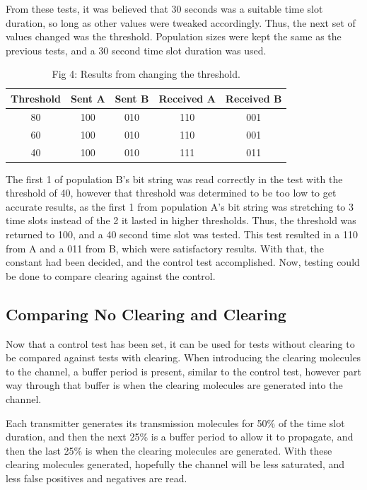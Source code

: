 \documentclass[conference]{IEEEtran}
\begin{document}
From these tests, it was believed that 30 seconds was a suitable time slot duration, so long as other values were tweaked accordingly. Thus, the next set of values changed was the threshold. Population sizes were kept the same as the previous tests, and a 30 second time slot duration was used.

\begin{table}[htbp]
\begin{center}
\begin{tabular}{|c|c|c|c|c|}
\hline
Threshold & Sent A & Sent B & Received A & Received B\\\hline
80 & 100 & 010 & 110 & 001\\\hline
60 & 100 & 010 & 110 & 001\\\hline
40 & 100 & 010 & 111 & 011\\\hline
\end{tabular}
\end{center}
\caption{Fig 4: Results from changing the threshold.}
\end{table}

The first 1 of population B’s bit string was read correctly in the test with the threshold of 40, however that threshold was determined to be too low to get accurate results, as the first 1 from population A’s bit string was stretching to 3 time slots instead of the 2 it lasted in higher thresholds. Thus, the threshold was returned to 100, and a 40 second time slot was tested. This test resulted in a 110 from A and a 011 from B, which were satisfactory results. With that, the constant had been decided, and the control test accomplished. Now, testing could be done to compare clearing against the control.

\subsection{Comparing No Clearing and Clearing}

Now that a control test has been set, it can be used for tests without clearing to be compared against tests with clearing. When introducing the clearing molecules to the channel, a buffer period is present, similar to the control test, however part way through that buffer is when the clearing molecules are generated into the channel.
\\
\par
Each transmitter generates its transmission molecules for 50\% of the time slot duration, and then the next 25\% is a buffer period to allow it to propagate, and then the last 25\% is when the clearing molecules are generated. With these clearing molecules generated, hopefully the channel will be less saturated, and less false positives and negatives are read.
\end{document}
